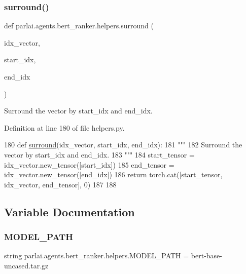 \subsubsection{\texorpdfstring{surround()}{surround()}}
{\footnotesize\ttfamily def parlai.\+agents.\+bert\+\_\+ranker.\+helpers.\+surround (\begin{DoxyParamCaption}\item[{}]{idx\+\_\+vector,  }\item[{}]{start\+\_\+idx,  }\item[{}]{end\+\_\+idx }\end{DoxyParamCaption})}

\begin{DoxyVerb}Surround the vector by start_idx and end_idx.
\end{DoxyVerb}
 

Definition at line 180 of file helpers.\+py.


\begin{DoxyCode}
180 \textcolor{keyword}{def }\hyperlink{namespaceparlai_1_1agents_1_1bert__ranker_1_1helpers_ae5621255d8851c9628c116cb6db4c28c}{surround}(idx\_vector, start\_idx, end\_idx):
181     \textcolor{stringliteral}{"""}
182 \textcolor{stringliteral}{    Surround the vector by start\_idx and end\_idx.}
183 \textcolor{stringliteral}{    """}
184     start\_tensor = idx\_vector.new\_tensor([start\_idx])
185     end\_tensor = idx\_vector.new\_tensor([end\_idx])
186     \textcolor{keywordflow}{return} torch.cat([start\_tensor, idx\_vector, end\_tensor], 0)
187 
188 
\end{DoxyCode}


\subsection{Variable Documentation}
\mbox{\label{namespaceparlai_1_1agents_1_1bert__ranker_1_1helpers_a596044b27f3659ebe25c250dca2f15f7}} 
\subsubsection{\texorpdfstring{M\+O\+D\+E\+L\+\_\+\+P\+A\+TH}{MODEL\_PATH}}
{\footnotesize\ttfamily string parlai.\+agents.\+bert\+\_\+ranker.\+helpers.\+M\+O\+D\+E\+L\+\_\+\+P\+A\+TH = \textquotesingle{}bert-\/base-\/uncased.\+tar.\+gz\textquotesingle{}}



